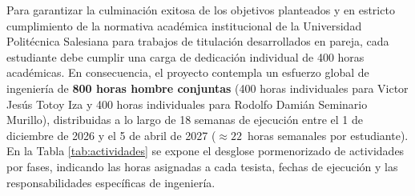 Para garantizar la culminación exitosa de los objetivos planteados y en estricto cumplimiento de la normativa académica institucional de la Universidad Politécnica Salesiana para trabajos de titulación desarrollados en pareja, cada estudiante debe cumplir una carga de dedicación individual de 400 horas académicas. En consecuencia, el proyecto contempla un esfuerzo global de ingeniería de \textbf{800 horas hombre conjuntas} (400 horas individuales para Victor Jesús Totoy Iza y 400 horas individuales para Rodolfo Damián Seminario Murillo), distribuidas a lo largo de 18 semanas de ejecución entre el 1 de diciembre de 2026 y el 5 de abril de 2027 ($\approx 22$~horas semanales por estudiante). En la Tabla \ref{tab:actividades} se expone el desglose pormenorizado de actividades por fases, indicando las horas asignadas a cada tesista, fechas de ejecución y las responsabilidades específicas de ingeniería.

